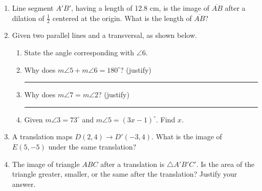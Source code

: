 \documentclass[12pt, twoside]{article}
\begin{document}
\begin{enumerate}
  
\newpage

\item Line segment $A'B'$, having a length of 12.8 cm, is the image of $\overline{AB}$ after a dilation of $\displaystyle \frac{1}{2}$ centered at the origin. What is the length of $\overline{AB}$? \vspace{4cm}
  

\item Given two parallel lines and a transversal, as shown below.
  \begin{center}
  \end{center}
  \begin{enumerate}
    \item State the angle corresponding with $\angle 6$. \vspace{0.5cm}
    \item Why does $m\angle 5 + m\angle 6 =180^\circ$? (justify) \rule{6cm}{0.15mm} \vspace{0.5cm}
    \item Why does $m\angle 7 = m\angle 2$?  (justify) \rule{7cm}{0.15mm} \vspace{0.5cm}
    \item Given $m\angle 3 = 73^\circ$ and $m\angle 5 = (3x-1)^\circ$. Find $x$. \vspace{5cm}
  \end{enumerate}

\newpage
\item A translation maps $D(2,4) \rightarrow D'(-3,4)$. What is the image of $E(5,-5)$ under the same translation?  \vspace{3.5cm}

\item The image of triangle $ABC$ after a translation is $\triangle A'B'C'$. Is the area of the triangle greater, smaller, or the same after the translation? Justify your answer. \vspace{3.5cm}


\end{enumerate}
\end{document}
